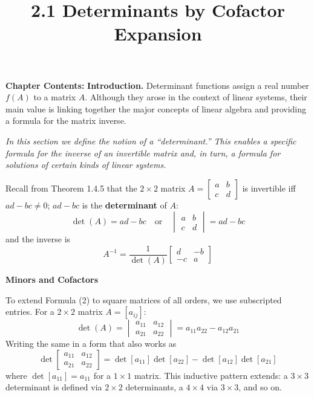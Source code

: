 \documentclass{article}
\title{2.1 Determinants by Cofactor Expansion}
\date{}
\author{}
\newcommand{\redheading}[1]{{\vspace{2mm}\noindent\Large\bfseries\color{red!55!black} #1\par}\vspace{2mm}}
\theoremstyle{mystyle}
\begin{document}
\maketitle

\begin{tcolorbox}[colback=blue!5, colframe=blue!60!black,
  title={\textbf{Chapter 2: Determinants}}, boxrule=0.5mm, arc=3mm]
\textbf{Chapter Contents:}
\textbf{Introduction.} Determinant functions assign a real number $f(A)$ to a matrix $A$. Although they arose in the context of linear systems, their main value is linking together the major concepts of linear algebra and providing a formula for the matrix inverse.
\end{tcolorbox}

\vspace{3mm}
{\itshape\color{blue!45!black}
In this section we define the notion of a ``determinant.'' This enables a specific formula for the inverse of an invertible matrix and, in turn, a formula for solutions of certain kinds of linear systems.\par}

\vspace{2mm}

Recall from Theorem 1.4.5 that the $2\times 2$ matrix $A=\begin{bmatrix}a&b\\c&d\end{bmatrix}$ is invertible iff $ad-bc\neq0$; $ad-bc$ is the \textbf{determinant} of $A$:
\[
\det(A)=ad-bc\quad\text{or}\quad\begin{vmatrix}a&b\\c&d\end{vmatrix}=ad-bc \tag{1}
\]
and the inverse is
\[
A^{-1}=\frac{1}{\det(A)}\begin{bmatrix}d&-b\\-c&a\end{bmatrix} \tag{2}
\]

\redheading{Minors and Cofactors}

To extend Formula (2) to square matrices of all orders, we use subscripted entries. For a $2\times2$ matrix $A=[a_{ij}]$:
\[
\det(A)=\begin{vmatrix}a_{11}&a_{12}\\a_{21}&a_{22}\end{vmatrix}=a_{11}a_{22}-a_{12}a_{21} \tag{3}
\]
Writing the same in a form that also works as
\[
\det\begin{bmatrix}a_{11}&a_{12}\\a_{21}&a_{22}\end{bmatrix}=\det[a_{11}]\det[a_{22}]-\det[a_{12}]\det[a_{21}] \tag{4}
\]
where $\det[a_{11}]=a_{11}$ for a $1\times1$ matrix. This inductive pattern extends: a $3\times3$ determinant is defined via $2\times2$ determinants, a $4\times4$ via $3\times3$, and so on.
\end{document}

